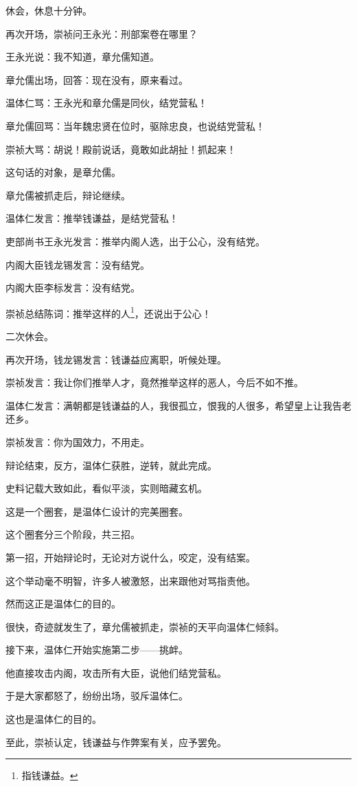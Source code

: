\begin{multicols}{\theparacolNo}
休会，休息十分钟。

再次开场，崇祯问王永光：刑部案卷在哪里？

王永光说：我不知道，章允儒知道。

章允儒出场，回答：现在没有，原来看过。

温体仁骂：王永光和章允儒是同伙，结党营私！

章允儒回骂：当年魏忠贤在位时，驱除忠良，也说结党营私！

崇祯大骂：胡说！殿前说话，竟敢如此胡扯！抓起来！

这句话的对象，是章允儒。

章允儒被抓走后，辩论继续。

温体仁发言：推举钱谦益，是结党营私！

吏部尚书王永光发言：推举内阁人选，出于公心，没有结党。

内阁大臣钱龙锡发言：没有结党。

内阁大臣李标发言：没有结党。

崇祯总结陈词：推举这样的人\footnote{指钱谦益。}，还说出于公心！

二次休会。

再次开场，钱龙锡发言：钱谦益应离职，听候处理。

崇祯发言：我让你们推举人才，竟然推举这样的恶人，今后不如不推。

温体仁发言：满朝都是钱谦益的人，我很孤立，恨我的人很多，希望皇上让我告老还乡。

崇祯发言：你为国效力，不用走。

辩论结束，反方，温体仁获胜，逆转，就此完成。

史料记载大致如此，看似平淡，实则暗藏玄机。

这是一个圈套，是温体仁设计的完美圈套。

这个圈套分三个阶段，共三招。

第一招，开始辩论时，无论对方说什么，咬定，没有结案。

这个举动毫不明智，许多人被激怒，出来跟他对骂指责他。

然而这正是温体仁的目的。

很快，奇迹就发生了，章允儒被抓走，崇祯的天平向温体仁倾斜。

接下来，温体仁开始实施第二步——挑衅。

他直接攻击内阁，攻击所有大臣，说他们结党营私。

于是大家都怒了，纷纷出场，驳斥温体仁。

这也是温体仁的目的。

至此，崇祯认定，钱谦益与作弊案有关，应予罢免。


\end{multicols}
